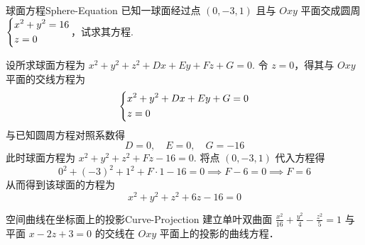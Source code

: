 \begin{problem}{球面方程}{Sphere-Equation}
    已知一球面经过点 $(0, -3, 1)$ 且与 $Oxy$ 平面交成圆周 $\begin{dcases} x^2 + y^2 = 16 \\ z = 0 \end{dcases}$，试求其方程.
\end{problem}

\begin{solution}
    设所求球面方程为 $x^2 + y^2 + z^2 + Dx + Ey + Fz + G = 0$. 令 $z = 0$，得其与 $Oxy$ 平面的交线方程为
    \begin{equation}
        \begin{dcases}
            x^2 + y^2 + Dx + Ey + G = 0 \\
            z = 0
        \end{dcases}
    \end{equation}
    与已知圆周方程对照系数得
    \begin{equation}
        D = 0, \quad E = 0, \quad G = -16
    \end{equation}
    此时球面方程为 $x^2 + y^2 + z^2 + Fz - 16 = 0$. 将点 $(0, -3, 1)$ 代入方程得
    \begin{equation}
        0^2 + (-3)^2 + 1^2 + F \cdot 1 - 16 = 0 \implies F - 6 = 0 \implies F = 6
    \end{equation}
    从而得到该球面的方程为
    \begin{equation}
        \boxed{x^2 + y^2 + z^2 + 6z - 16 = 0}
    \end{equation}
\end{solution}


\begin{problem}{空间曲线在坐标面上的投影}{Curve-Projection}
    建立单叶双曲面 $\frac{x^2}{16} + \frac{y^2}{4} - \frac{z^2}{5} = 1$ 与平面 $x - 2z + 3 = 0$ 的交线在 $Oxy$ 平面上的投影的曲线方程．
\end{problem}


